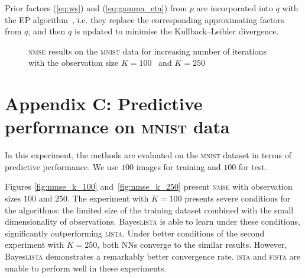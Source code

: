 \documentclass{article}
\begin{document}
  Prior factors (\ref{eq:ws}) and (\ref{eq:gamma_eta}) from $p$ are incorporated into $q$ with the EP algorithm~\cite{hernandez2015probabilistic}, i.e. they replace the corresponding approximating factors from $q$, and then $q$ is updated to minimise the Kullback--Leibler divergence.
  
   \begin{figure}[!t]
  \centering
  \hfil
  \caption{\textsc{nmse} results on the \textsc{mnist} data for increasing number of iterations with the observation size $K = 100$~\protect{} and $K = 250$~\protect{}}
  \label{fig:number_of_layers_synthetic}
  \end{figure}    

\section*{Appendix C: Predictive performance on \textsc{mnist} data}
In this experiment, the methods are evaluated on the \textsc{mnist} dataset in terms of predictive performance. We use $100$ images for training and $100$ for test.
  
  Figures \ref{fig:nmse_k_100} and~\ref{fig:nmse_k_250} present \textsc{nmse} with observation sizes $100$ and $250$. The experiment with $K=100$ presents severe conditions for the algorithms: the limited size of the training dataset combined with the small dimensionality of observations. Bayes\textsc{lista} is able to learn under these conditions, significantly outperforming \textsc{lista}. Under better conditions of the second experiment with $K=250$, both NNs converge to the similar results. However, Bayes\textsc{lista} demonstrates a remarkably better convergence rate. \textsc{ista} and \textsc{fista} are unable to perform well in these experiments.
\end{document}
